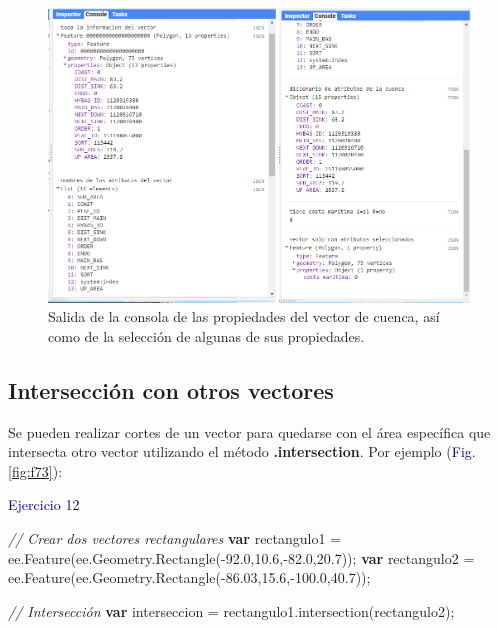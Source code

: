 \documentclass[
  12pt,
  letterpaper,
  twoside]{book}
\newenvironment{Shaded}{\begin{snugshade}}{\end{snugshade}}
\newcommand{\AttributeTok}[1]{\textcolor[rgb]{0.48,0.12,0.64}{#1}}
\newcommand{\CommentTok}[1]{\textcolor[rgb]{0.24,0.58,0.00}{\textit{#1}}}
\newcommand{\ControlFlowTok}[1]{\textcolor[rgb]{0.00,0.00,0.00}{\textbf{#1}}}
\newcommand{\FloatTok}[1]{\textcolor[rgb]{0.28,0.53,0.93}{#1}}
\newcommand{\FunctionTok}[1]{\textcolor[rgb]{0.48,0.12,0.64}{#1}}
\newcommand{\KeywordTok}[1]{\textcolor[rgb]{0.48,0.12,0.64}{#1}}
\newcommand{\NormalTok}[1]{#1}
\newcommand{\OperatorTok}[1]{\textcolor[rgb]{0.00,0.00,0.00}{#1}}
\newcommand\boldpurple[1]{\textcolor{darkpurple}{\textbf{#1}}}
\begin{document}
\begin{figure}[H]

{\centering \includegraphics[width=0.95\linewidth]{Img/ej11} 

}

\caption{Salida de la consola de las propiedades del vector de cuenca, así como de la selección de algunas de sus propiedades.}\label{fig:f72}
\end{figure}

\hypertarget{intersecciuxf3n-con-otros-vectores}{%
\subsection*{Intersección con otros vectores}\label{intersecciuxf3n-con-otros-vectores}}

Se pueden realizar cortes de un vector para quedarse con el área específica que intersecta otro vector utilizando el método \boldpurple{.intersection}. Por ejemplo (\textcolor{darkblue}{Fig.} \ref{fig:f73}):

\textcolor{darkblue}{Ejercicio 12}

\begin{Shaded}
\begin{Highlighting}[]
\CommentTok{// Crear dos vectores rectangulares}
\ControlFlowTok{var}\NormalTok{ rectangulo1 }\OperatorTok{=} \KeywordTok{ee}\OperatorTok{.}\FunctionTok{Feature}\NormalTok{(}\KeywordTok{ee}\OperatorTok{.}\AttributeTok{Geometry}\OperatorTok{.}\FunctionTok{Rectangle}\NormalTok{(}\OperatorTok{{-}}\FloatTok{92.0}\OperatorTok{,}\FloatTok{10.6}\OperatorTok{,{-}}\FloatTok{82.0}\OperatorTok{,}\FloatTok{20.7}\NormalTok{))}\OperatorTok{;}
\ControlFlowTok{var}\NormalTok{ rectangulo2 }\OperatorTok{=} \KeywordTok{ee}\OperatorTok{.}\FunctionTok{Feature}\NormalTok{(}\KeywordTok{ee}\OperatorTok{.}\AttributeTok{Geometry}\OperatorTok{.}\FunctionTok{Rectangle}\NormalTok{(}\OperatorTok{{-}}\FloatTok{86.03}\OperatorTok{,}\FloatTok{15.6}\OperatorTok{,{-}}\FloatTok{100.0}\OperatorTok{,}\FloatTok{40.7}\NormalTok{))}\OperatorTok{;}

\CommentTok{// Intersección}
\ControlFlowTok{var}\NormalTok{ interseccion }\OperatorTok{=}\NormalTok{ rectangulo1}\OperatorTok{.}\FunctionTok{intersection}\NormalTok{(rectangulo2)}\OperatorTok{;}
\end{Highlighting}
\end{Shaded}
\end{document}
